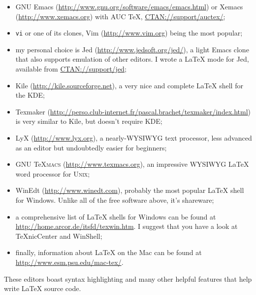 \documentclass[11pt]{article}
\def\unix    {\textsc{Unix}}
\newcommand{\app}[1]
{\texttt{#1}}
\begin{document}
\begin{itemize}

  \item GNU Emacs (\url{http://www.gnu.org/software/emacs/emacs.html}) or
    Xemacs (\url{http://www.xemacs.org}) with AUC \TeX,
    \href{http://www.ctan.org/tex-archive/support/auctex/}
    {CTAN://support/auctex/};
    
  \item \app{vi} or one of its clones, Vim (\url{http://www.vim.org})
    being the most popular;
    
  \item my personal choice is Jed (\url{http://www.jedsoft.org/jed/}),
  a light Emacs clone that also supports emulation of other editors. I
  wrote a \LaTeX{} mode for Jed, available from 
  \href{http://www.ctan.org/tex-archive/support/jed/}{CTAN://support/jed};
  
  \item Kile (\url{http://kile.sourceforge.net}), a
  very nice and complete \LaTeX{} shell for the KDE;
  
  \item Texmaker 
  (\url{http://perso.club-internet.fr/pascal.brachet/texmaker/index.html})
  is very similar to Kile, but doesn't require KDE;
  
  \item LyX (\url{http://www.lyx.org}), a nearly-WYSIWYG text processor,
  less advanced as an editor but undoubtedly easier for beginners;
  
  \item GNU \TeX\textsc{macs} (\url{http://www.texmacs.org}), an
  impressive WYSIWYG \LaTeX{} word processor for \unix;
  
  \item WinEdt (\url{http://www.winedt.com}), probably the most popular 
  \LaTeX{} shell for Windows. Unlike all of the free software above, it's
  shareware;
  
  \item a comprehensive list of \LaTeX{} shells for Windows can be found at
  \url{http://home.arcor.de/itsfd/texwin.htm}. I suggest that you have a
  look at TeXnicCenter and WinShell;
  
  \item finally, information about \LaTeX{} on the Mac can be found at
  \url{http://www.esm.psu.edu/mac-tex/}.
  
\end{itemize}

These editors boast syntax highlighting and many other helpful features that
help write \LaTeX{} source code.
\end{document}

